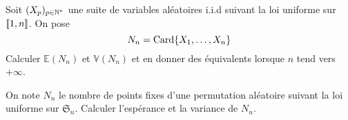 \begin{exo}
    \label{probas1}
    Soit $(X_p)_{p\in\operatorname{\mathbb N}^*}$ une suite de variables aléatoires i.i.d suivant la loi uniforme sur $[\![1,n]\!]$.
    On pose 
    \[
        N_n=\operatorname{Card}\lbrace X_1,\dots,X_n\rbrace  
    \]
    Calculer $\mathbb E(N_n)$ et $\mathbb V(N_n)$ et en donner des équivalents lorsque $n$ tend vers $+\infty$.
\end{exo}

\begin{exo}
    \label{probas2}
    On note $N_n$ le nombre de points fixes d'une permutation aléatoire suivant la loi uniforme sur $\mathfrak S_n$.
    Calculer l'espérance et la variance de $N_n$.
\end{exo}